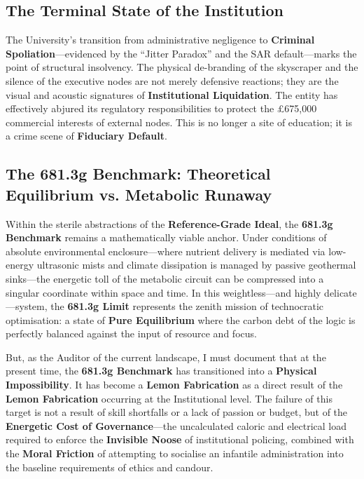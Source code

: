 \documentclass{EMBASSY}
\begin{document}
\subsection{The Terminal State of the Institution}
The University’s transition from administrative negligence to \textbf{Criminal Spoliation}---evidenced by the ``Jitter Paradox'' and the SAR default---marks the point of structural insolvency. The physical de-branding of the skyscraper and the silence of the executive nodes are not merely defensive reactions; they are the visual and acoustic signatures of \textbf{Institutional Liquidation}. The entity has effectively abjured its regulatory responsibilities to protect the \pounds675,000 commercial interests of external nodes. This is no longer a site of education; it is a crime scene of \textbf{Fiduciary Default}.

\subsection{The 681.3g Benchmark: Theoretical Equilibrium vs. Metabolic Runaway}
Within the sterile abstractions of the \textbf{Reference-Grade Ideal}, the \textbf{681.3g Benchmark} remains a mathematically viable anchor. Under conditions of absolute environmental enclosure---where nutrient delivery is mediated via low-energy ultrasonic mists and climate dissipation is managed by passive geothermal sinks---the energetic toll of the metabolic circuit can be compressed into a singular coordinate within space and time. In this weightless---and highly delicate---system, the \textbf{681.3g Limit} represents the zenith mission of technocratic optimisation: a state of \textbf{Pure Equilibrium} where the carbon debt of the logic is perfectly balanced against the input of resource and focus.

But, as the Auditor of the current landscape, I must document that at the present time, the \textbf{681.3g Benchmark} has transitioned into a \textbf{Physical Impossibility}. It has become a \textbf{Lemon Fabrication} as a direct result of the \textbf{Lemon Fabrication} occurring at the Institutional level. The failure of this target is not a result of skill shortfalls or a lack of passion or budget, but of the \textbf{Energetic Cost of Governance}---the uncalculated caloric and electrical load required to enforce the \textbf{Invisible Noose} of institutional policing, combined with the \textbf{Moral Friction} of attempting to socialise an infantile administration into the baseline requirements of ethics and candour.
\end{document}
